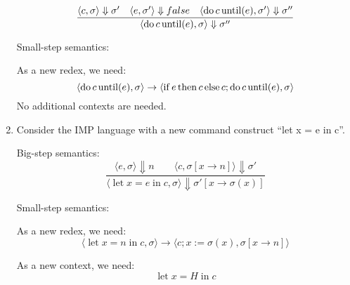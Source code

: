 \documentclass{article}
\begin{document}
\begin{enumerate}
  \[\frac{
  \langle c, \sigma \rangle \Downarrow \sigma'   \quad
  \langle e, \sigma' \rangle \Downarrow false    \quad
  \langle \operatorname{do} c \operatorname{until}(e), \sigma' \rangle \Downarrow \sigma'' }
  {\langle \operatorname{do} c \operatorname{until}(e), \sigma \rangle \Downarrow \sigma'' }
  \]

  Small-step semantics:

  As a new redex, we need:
  \[
  \langle \operatorname{do} c \operatorname{until}(e), \sigma \rangle \rightarrow
          \langle \operatorname{if} e \operatorname{then} c \operatorname{else} c;\operatorname{do} c \operatorname{until}(e), \sigma \rangle
  \]
  No additional contexts are needed.


  \item Consider the IMP language with a new command construct ``let x = e in
  c''.
  \newcommand{\letin}[2]{\operatorname{let} x = #1 \operatorname{in} #2}

Big-step semantics:
  \[\frac{
  \langle e, \sigma \rangle \Downarrow n    \qquad
  \langle c, \sigma[x \rightarrow n] \rangle \Downarrow \sigma' }
  {\langle \letin{e}{c}, \sigma \rangle \Downarrow
          \sigma'[x \rightarrow \sigma(x)]}
  \]

Small-step semantics:

  As a new redex, we need:
  \[
  \langle \letin{n}{c}, \sigma \rangle \rightarrow
      \langle c; x:= \sigma(x), \sigma[x \rightarrow n] \rangle
  \]

  As a new context, we need:
  \[
    \letin{H}{c}
  \]
\end{enumerate}
\end{document}
